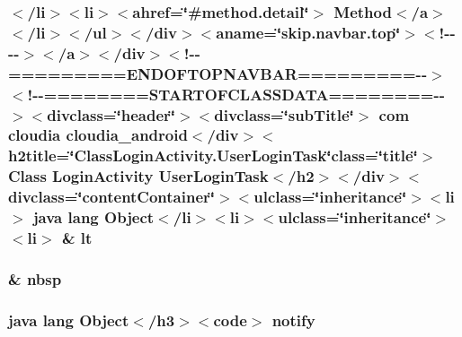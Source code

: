\hypertarget{_login_activity_8_user_login_task_8html_ae95394f5c0dafcac0242ed1df8405d45}{
\subsubsection[{lt}]{\setlength{\rightskip}{0pt plus 5cm}$<$/li$>$$<$li$>$$<$ahref=\char`\"{}\#method.\-detail\char`\"{}$>$ Method$<$/{\bf a}$>$$<$/li$>$$<$/ul$>$$<$/div$>$$<$aname=\char`\"{}skip.\-navbar.\-top\char`\"{}$>$$<$!-\/-\/-\/-\/$>$$<$/a$>$$<$/div$>$$<$!-\/-\/=========E\-N\-D\-O\-F\-T\-O\-P\-N\-A\-V\-B\-A\-R=========-\/-\/$>$$<$!-\/-\/========S\-T\-A\-R\-T\-O\-F\-C\-L\-A\-S\-S\-D\-A\-T\-A========-\/-\/$>$$<$divclass=\char`\"{}header\char`\"{}$>$$<$divclass=\char`\"{}sub\-Title\char`\"{}$>$ com cloudia cloudia\-\_\-android$<$/div$>$$<$h2title=\char`\"{}Class\-Login\-Activity.\-User\-Login\-Task\char`\"{}class=\char`\"{}title\char`\"{}$>$ Class {\bf Login\-Activity} User\-Login\-Task$<$/h2$>$$<$/div$>$$<$divclass=\char`\"{}content\-Container\char`\"{}$>$$<$ulclass=\char`\"{}inheritance\char`\"{}$>$$<$li$>$ java lang Object$<$/li$>$$<$li$>$$<$ulclass=\char`\"{}inheritance\char`\"{}$>$$<$li$>$ \& lt}}\label{_login_activity_8_user_login_task_8html_ae95394f5c0dafcac0242ed1df8405d45}
\hypertarget{_login_activity_8_user_login_task_8html_aef915316f784c9063d942974538301a6}{
\subsubsection[{nbsp}]{\setlength{\rightskip}{0pt plus 5cm}\& nbsp}}\label{_login_activity_8_user_login_task_8html_aef915316f784c9063d942974538301a6}
\hypertarget{_login_activity_8_user_login_task_8html_ae99ae10b5010594dbda4794e02db271b}{
\subsubsection[{notify}]{\setlength{\rightskip}{0pt plus 5cm}java lang Object$<$/h3$>$$<$code$>$ notify}}\label{_login_activity_8_user_login_task_8html_ae99ae10b5010594dbda4794e02db271b}
